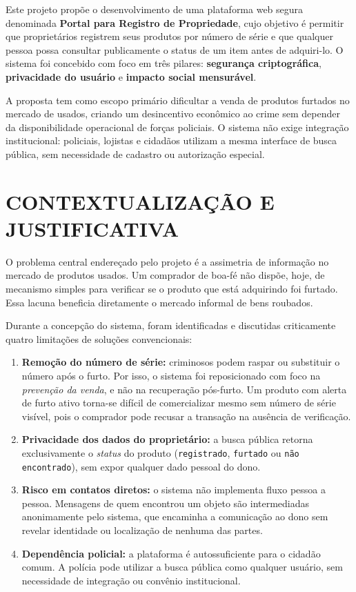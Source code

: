 \documentclass[12pt,a4paper]{article}
\begin{document}
Este projeto propõe o desenvolvimento de uma plataforma web segura denominada \textbf{Portal para Registro de Propriedade}, cujo objetivo é permitir que proprietários registrem seus produtos por número de série e que qualquer pessoa possa consultar publicamente o status de um item antes de adquiri-lo. O sistema foi concebido com foco em três pilares: \textbf{segurança criptográfica}, \textbf{privacidade do usuário} e \textbf{impacto social mensurável}.

A proposta tem como escopo primário dificultar a venda de produtos furtados no mercado de usados, criando um desincentivo econômico ao crime sem depender da disponibilidade operacional de forças policiais. O sistema não exige integração institucional: policiais, lojistas e cidadãos utilizam a mesma interface de busca pública, sem necessidade de cadastro ou autorização especial.

\section{CONTEXTUALIZAÇÃO E JUSTIFICATIVA}

O problema central endereçado pelo projeto é a assimetria de informação no mercado de produtos usados. Um comprador de boa-fé não dispõe, hoje, de mecanismo simples para verificar se o produto que está adquirindo foi furtado. Essa lacuna beneficia diretamente o mercado informal de bens roubados.

Durante a concepção do sistema, foram identificadas e discutidas criticamente quatro limitações de soluções convencionais:

\begin{enumerate}
  \item \textbf{Remoção do número de série:} criminosos podem raspar ou substituir o número após o furto. Por isso, o sistema foi reposicionado com foco na \textit{prevenção da venda}, e não na recuperação pós-furto. Um produto com alerta de furto ativo torna-se difícil de comercializar mesmo sem número de série visível, pois o comprador pode recusar a transação na ausência de verificação.

  \item \textbf{Privacidade dos dados do proprietário:} a busca pública retorna exclusivamente o \textit{status} do produto (\texttt{registrado}, \texttt{furtado} ou \texttt{não encontrado}), sem expor qualquer dado pessoal do dono.

  \item \textbf{Risco em contatos diretos:} o sistema não implementa fluxo pessoa a pessoa. Mensagens de quem encontrou um objeto são intermediadas anonimamente pelo sistema, que encaminha a comunicação ao dono sem revelar identidade ou localização de nenhuma das partes.

  \item \textbf{Dependência policial:} a plataforma é autossuficiente para o cidadão comum. A polícia pode utilizar a busca pública como qualquer usuário, sem necessidade de integração ou convênio institucional.
\end{enumerate}
\end{document}
